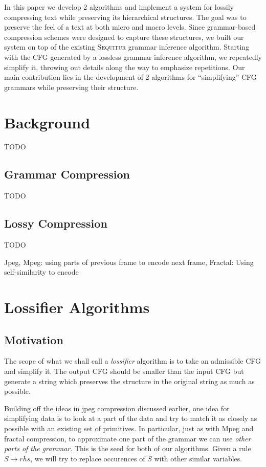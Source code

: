 \documentclass[11pt]{article}
\newcommand{\Sequitur}{\textsc{Sequitur}\xspace}
\begin{document}
In this paper we develop 2 algorithms and implement a system for lossily
compressing text while preserving its hierarchical structures. The goal
was to preserve the feel of a text at both micro and macro levels. 
Since grammar-based compression schemes were designed to capture
these structures, we built
our system on top of the existing \Sequitur grammar inference algorithm. 
Starting with the CFG generated by a lossless grammar
inference algorithm, we repeatedly simplify it, throwing out details
along the way to emphasize repetitions. Our main contribution lies in the
development of 2 algorithms for ``simplifying'' CFG grammars while 
preserving their structure.

\section{Background}

TODO

\subsection{Grammar Compression}

TODO

\subsection{Lossy Compression}

TODO

Jpeg, Mpeg: using parts of previous frame to encode next frame, 
Fractal: Using self-similarity to encode

\section{Lossifier Algorithms}

\subsection{Motivation}

The scope of what we shall call a \emph{lossifier} algorithm is to take
an admissible CFG and simplify it. The output CFG should be smaller
than the input CFG but generate a string which preserves the
structure in the original string as much as possible. 

Building off the ideas in jpeg compression discussed
earlier, one idea for simplifying data is to look at a part
of the data and try to match it as closely as possible with an
existing set of primitives. In particular, just as with Mpeg and
fractal compression, to approximate one part of the grammar
we can use \emph{other parts of the grammar}. This is the seed for
both of our algorithms. Given a rule $S \rightarrow rhs$, we will
try to replace occurences of $S$ with other similar variables.
\end{document}
